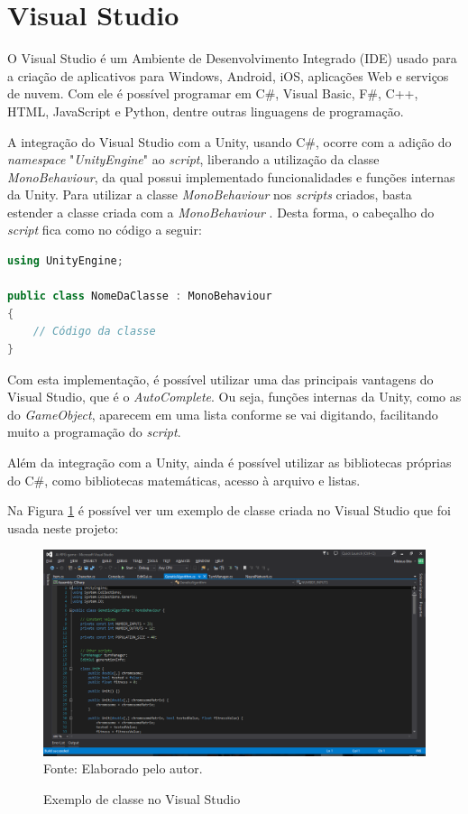 \documentclass[
	12pt,					%
	openright,				%
	oneside,				%
	a4paper,				%
	bibjustif,				%
	chapter=TITLE,			%
	english,				%
	brazil,					%
	]{abntex2}
\newcommand{\source}[1]{\small Fonte: {#1}}
\begin{document}
	\FloatBarrier
	\section{Visual Studio}
		O Visual Studio é um Ambiente de Desenvolvimento Integrado (IDE) usado para a criação de aplicativos para Windows, Android, iOS, aplicações Web e serviços de nuvem.
		Com ele é possível programar em C\#, Visual Basic, F\#, C++, HTML, JavaScript e Python, dentre outras linguagens de programação. \cite{microsoft}
		
		A integração do Visual Studio com a Unity, usando C\#, ocorre com a adição do \textit{namespace} "\textit{UnityEngine}"{} ao \textit{script},
		liberando a utilização da classe \textit{MonoBehaviour},
		da qual possui implementado funcionalidades e funções internas da Unity.
		Para utilizar a classe \textit{MonoBehaviour} nos \textit{scripts} criados,
		basta estender a classe criada com a \textit{MonoBehaviour} \cite{unityScripts}.
		Desta forma, o cabeçalho do \textit{script} fica como no código a seguir:
		
		\begin{lstlisting}[language=C++]
using UnityEngine;

public class NomeDaClasse : MonoBehaviour
{
	// Código da classe
}\end{lstlisting}
		
		Com esta implementação, é possível utilizar uma das principais vantagens do Visual Studio,
		que é o \textit{AutoComplete}.
		Ou seja, funções internas da Unity, como as do \textit{GameObject}, aparecem em uma lista conforme se vai digitando,
		facilitando muito a programação do \textit{script}.
		
		Além da integração com a Unity,
		ainda é possível utilizar as bibliotecas próprias do C\#,
		como bibliotecas matemáticas, acesso à arquivo e listas.
		
		Na Figura \ref{fig:exvs} é possível ver um exemplo de classe criada no Visual Studio que foi usada neste projeto:
		
		\begin{figure}[ht!]
			\caption{Exemplo de classe no Visual Studio}
			\centering
			\includegraphics[scale=0.4]{img/InterfaceVisualStudio.png}\\
			\vspace{0.5mm}
			\source{Elaborado pelo autor.}
			\label{fig:exvs}
		\end{figure}
		
\end{document}

